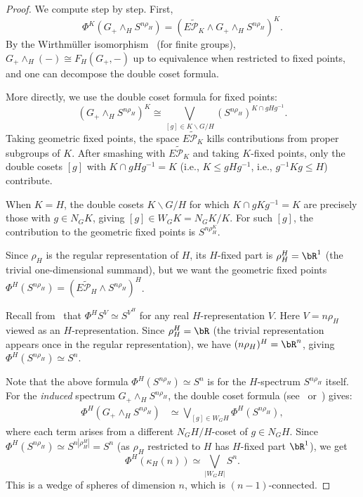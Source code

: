 \documentclass[12pt]{article}
\theoremstyle{definition}
\begin{document}
\begin{proof}
We compute step by step.  First,
\[
   \Phi^K(G_+ \wedge_H S^{n\rho_H}) = (\widetilde{E\mathcal{P}_K} \wedge G_+ \wedge_H S^{n\rho_H})^K.
\]
By the Wirthmüller isomorphism~\cite[II.6.1]{LMS} (for finite groups), $G_+ \wedge_H (-) \cong F_H(G_+, -)$ up to equivalence when restricted to fixed points, and one can decompose the double coset formula.

More directly, we use the double coset formula for fixed points:
\[
   (G_+ \wedge_H S^{n\rho_H})^K \cong \bigvee_{[g]\in K\backslash G / H} (S^{n\rho_H})^{K\cap gHg^{-1}}.
\]
Taking geometric fixed points, the space $\widetilde{E\mathcal{P}_K}$ kills contributions from proper subgroups of $K$.  After smashing with $\widetilde{E\mathcal{P}_K}$ and taking $K$-fixed points, only the double cosets $[g]$ with $K\cap gHg^{-1} = K$ (i.e., $K \leq gHg^{-1}$, i.e., $g^{-1}Kg \leq H$) contribute.

When $K = H$, the double cosets $K\backslash G/H$ for which $K\cap gKg^{-1} = K$ are precisely those with $g\in N_G K$, giving $[g]\in W_G K = N_G K/K$.  For such $[g]$, the contribution to the geometric fixed points is $S^{n\rho_H^K}$.

Since $\rho_H$ is the regular representation of $H$, its $H$-fixed part is $\rho_H^H = \bR^1$ (the trivial one-dimensional summand), but we want the geometric fixed points $\Phi^H(S^{n\rho_H}) = (\widetilde{E\mathcal{P}_H}\wedge S^{n\rho_H})^H$.

Recall from~\cite[Lem.~B.7]{HHR} that $\Phi^H S^V \simeq S^{V^H}$ for any real $H$-representation $V$.  Here $V = n\rho_H$ viewed as an $H$-representation.  Since $\rho_H^H = \bR$ (the trivial representation appears once in the regular representation), we have $(n\rho_H)^H = \bR^n$, giving $\Phi^H(S^{n\rho_H}) \simeq S^n$.

Note that the above formula $\Phi^H(S^{n\rho_H})\simeq S^n$ is for the $H$-spectrum $S^{n\rho_H}$ itself.  For the \emph{induced} spectrum $G_+\wedge_H S^{n\rho_H}$, the double coset formula (see~\cite[Prop.~B.213]{HHR} or~\cite[XVI.6.4]{LMS}) gives:
\begin{align*}
   \Phi^H(G_+\wedge_H S^{n\rho_H}) &\simeq \bigvee_{[g]\in W_G H} \Phi^H(S^{n\rho_H}),
\end{align*}
where each term arises from a different $N_G H/H$-coset of $g\in N_G H$.  Since $\Phi^H(S^{n\rho_H})\simeq S^{n|\rho_H^H|} = S^n$ (as $\rho_H$ restricted to $H$ has $H$-fixed part $\bR^1$), we get
\[
   \Phi^H(\kappa_H(n)) \simeq \bigvee_{|W_G H|} S^n.
\]
This is a wedge of spheres of dimension $n$, which is $(n-1)$-connected.
\end{proof}
\end{document}
